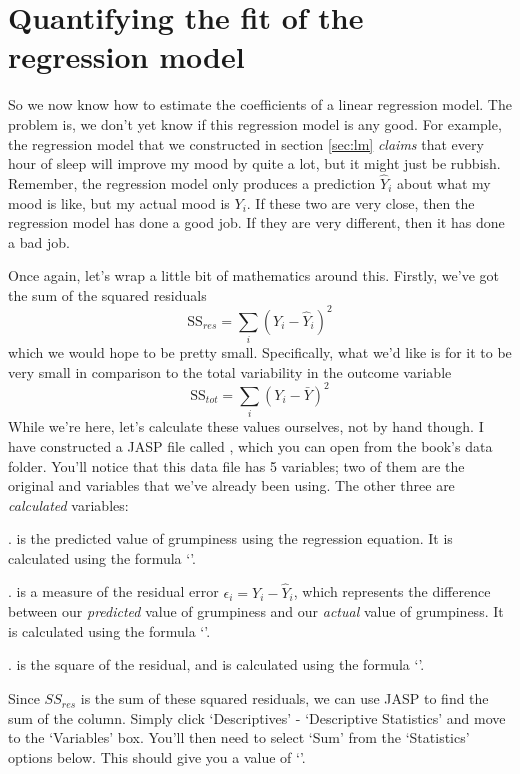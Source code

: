 \section{Quantifying the fit of the regression model~\label{sec:r2}}

So we now know how to estimate the coefficients of a linear regression model. The problem is, we don't yet know if this regression model is any good. For example, the regression model that we constructed in section \ref{sec:lm} {\it claims} that every hour of sleep will improve my mood by quite a lot, but it might just be rubbish. Remember, the regression model only produces a prediction $\hat{Y}_i$ about what my mood is like, but my actual mood is $Y_i$. If these two are very close, then the regression model has done a good job. If they are very different, then it has done a bad job. 


Once again, let's wrap a little bit of mathematics around this. Firstly, we've got the sum of the squared residuals
$$
\mbox{SS}_{res} = \sum_i (Y_i - \hat{Y}_i)^2
$$
which we would hope to be pretty small. Specifically, what we'd like is for it to be very small in comparison to the total variability in the outcome variable
$$
\mbox{SS}_{tot} = \sum_i (Y_i - \bar{Y})^2
$$
While we're here, let's calculate these values ourselves, not by hand though.  I have constructed a JASP file called , which you can open from the book's data folder.  You'll notice that this data file has 5 variables; two of them are the original  and  variables that we've already been using.  The other three are \emph{calculated} variables:

.  is the predicted value of grumpiness using the regression equation.  It is calculated using the formula `'.

.  is a measure of the residual error $\epsilon_i = Y_i-\hat{Y}_i$, which represents the difference between our \emph{predicted} value of grumpiness and our \emph{actual} value of grumpiness.  It is calculated using the formula `'.

.  is the square of the residual, and is calculated using the formula `'.


Since $SS_{res}$ is the sum of these squared residuals, we can use JASP to find the sum of the  column. Simply click `Descriptives' - `Descriptive Statistics' and move  to the `Variables' box.  You'll then need to select `Sum' from the `Statistics' options below. This should give you a value of `'.

